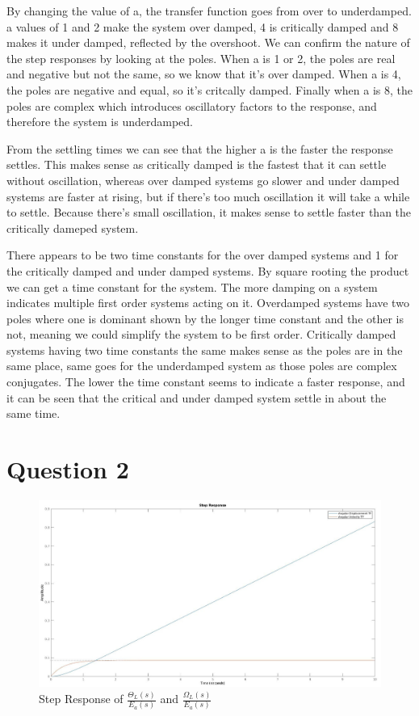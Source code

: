 \documentclass[a4paper, 12pt]{article}
\begin{document}
        By changing the value of a, the transfer function goes from over to underdamped. a values of 1 and 2 make the system over damped, 4 is critically damped and 8 makes it under damped, reflected by the overshoot. We can confirm the nature of the step responses by looking at the poles. When a is 1 or 2, the poles are real and negative but not the same, so we know that it's over damped. When a is 4, the poles are negative and equal, so it's critcally damped. Finally when a is 8, the poles are complex which introduces oscillatory factors to the response, and therefore the system is underdamped.   
        \par
        From the settling times we can see that the higher a is the faster the response settles. This makes sense as critically damped is the fastest that it can settle without oscillation, whereas over damped systems go slower and under damped systems are faster at rising, but if there's too much oscillation it will take a while to settle. Because there's small oscillation, it makes sense to settle faster than the critically dameped system.
        \par
        There appears to be two time constants for the over damped systems and 1 for the critically damped and under damped systems. By square rooting the product we can get a time constant for the system. The more damping on a system indicates multiple first order systems acting on it. Overdamped systems have two poles where one is dominant shown by the longer time constant and the other is not, meaning we could simplify the system to be first order. Critically damped systems having two time constants the same makes sense as the poles are in the same place, same goes for the underdamped system as those poles are complex conjugates. The lower the time constant seems to indicate a faster response, and it can be seen that the critical and under damped system settle in about the same time.

    \section{Question 2}

        

        \begin{figure}[!h]
            \centering
            \includegraphics[width=\textwidth]{q2.jpg}
            \caption{Step Response of $\frac{\Theta_L(s)}{E_a(s)}$ and $\frac{\Omega_L(s)}{E_a(s)}$}
            \label{fig:q2}
        \end{figure}
\end{document}
